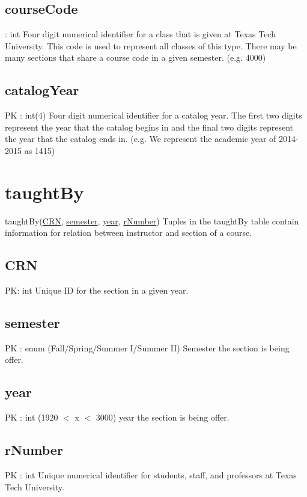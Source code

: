 	\subsection{courseCode}
		: int
		Four digit numerical identifier for a class that is given at Texas Tech University. This code is used to represent all classes of this type. There may be many sections that share a course code in a given semester. (e.g. 4000)
	
	\subsection{catalogYear}
		PK : int(4) 
		Four digit numerical identifier for a catalog year. The first two digits represent the year that the catalog begins in and the final two digits represent the year that the catalog ends in. (e.g. We represent the academic year of 2014-2015 as 1415)


\section{taughtBy}
	taughtBy(\underline{CRN}, \underline{semester}, \underline{year}, \underline{rNumber}) 
		Tuples in the taughtBy table contain information for relation between instructor and section of a course.
 	
 	\subsection{CRN}
		PK: int 
		Unique ID for the section in a given year.
		
	\subsection{semester}
		PK : enum (Fall/Spring/Summer I/Summer II)
		Semester the section is being offer.
	
	\subsection{year}
		PK : int (1920 $<$ x $<$ 3000) 
		year the section is being offer.
	
	\subsection{rNumber}
		PK : int 
		Unique numerical identifier for students, staff, and professors at Texas Tech University.


